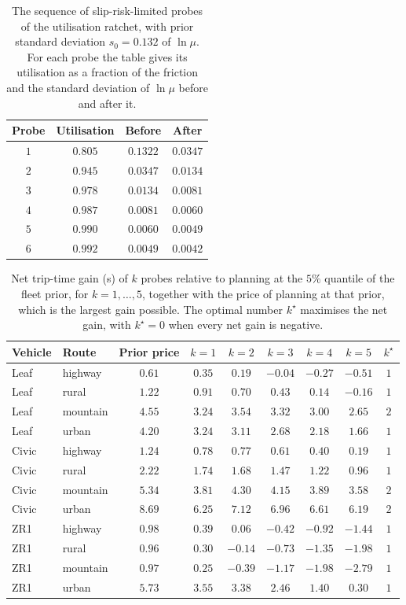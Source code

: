 \begin{table}[htbp]
\centering\small
\caption{The sequence of slip-risk-limited probes of the utilisation ratchet, with prior standard deviation $s_0=0.132$ of $\ln\mu$. For each probe the table gives its utilisation as a fraction of the friction and the standard deviation of $\ln\mu$ before and after it.}\label{tab:app-ratchet}
\begin{tabular}{cccc}
\toprule
Probe & Utilisation & Before & After\\
\midrule
$1$ & $0.805$ & $0.1322$ & $0.0347$\\
$2$ & $0.945$ & $0.0347$ & $0.0134$\\
$3$ & $0.978$ & $0.0134$ & $0.0081$\\
$4$ & $0.987$ & $0.0081$ & $0.0060$\\
$5$ & $0.990$ & $0.0060$ & $0.0049$\\
$6$ & $0.992$ & $0.0049$ & $0.0042$\\
\bottomrule
\end{tabular}
\end{table}

\begin{table}[htbp]
\centering\small
\setlength{\tabcolsep}{4.5pt}
\caption{Net trip-time gain (s) of $k$ probes relative to planning at the $5\%$ quantile of the fleet prior, for $k=1,\dots,5$, together with the price of planning at that prior, which is the largest gain possible. The optimal number $k^\star$ maximises the net gain, with $k^\star=0$ when every net gain is negative.}\label{tab:app-kstar}
\begin{tabular}{llccccccc}
\toprule
Vehicle & Route & Prior price & $k=1$ & $k=2$ & $k=3$ & $k=4$ & $k=5$ & $k^\star$\\
\midrule
Leaf & highway & $0.61$ & $0.35$ & $0.19$ & $-0.04$ & $-0.27$ & $-0.51$ & $1$\\
Leaf & rural & $1.22$ & $0.91$ & $0.70$ & $0.43$ & $0.14$ & $-0.16$ & $1$\\
Leaf & mountain & $4.55$ & $3.24$ & $3.54$ & $3.32$ & $3.00$ & $2.65$ & $2$\\
Leaf & urban & $4.20$ & $3.24$ & $3.11$ & $2.68$ & $2.18$ & $1.66$ & $1$\\
Civic & highway & $1.24$ & $0.78$ & $0.77$ & $0.61$ & $0.40$ & $0.19$ & $1$\\
Civic & rural & $2.22$ & $1.74$ & $1.68$ & $1.47$ & $1.22$ & $0.96$ & $1$\\
Civic & mountain & $5.34$ & $3.81$ & $4.30$ & $4.15$ & $3.89$ & $3.58$ & $2$\\
Civic & urban & $8.69$ & $6.25$ & $7.12$ & $6.96$ & $6.61$ & $6.19$ & $2$\\
ZR1 & highway & $0.98$ & $0.39$ & $0.06$ & $-0.42$ & $-0.92$ & $-1.44$ & $1$\\
ZR1 & rural & $0.96$ & $0.30$ & $-0.14$ & $-0.73$ & $-1.35$ & $-1.98$ & $1$\\
ZR1 & mountain & $0.97$ & $0.25$ & $-0.39$ & $-1.17$ & $-1.98$ & $-2.79$ & $1$\\
ZR1 & urban & $5.73$ & $3.55$ & $3.38$ & $2.46$ & $1.40$ & $0.30$ & $1$\\
\bottomrule
\end{tabular}
\end{table}
